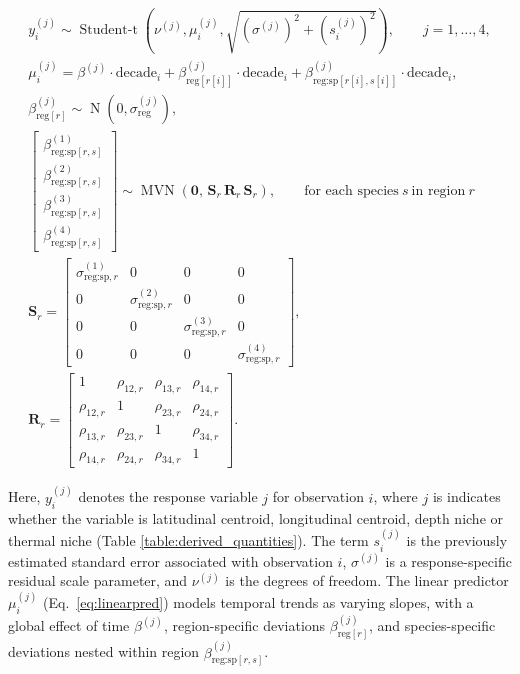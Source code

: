 \documentclass[pdflatex,sn-nature,referee]{sn-jnl}%
\begin{document}
\begin{gather}
y_{i}^{(j)} \sim \operatorname{Student\text{-}t}
\left(\nu^{(j)}, 
\mu_{i}^{(j)}, 
\sqrt{(\sigma^{(j)})^{2} + (s^{(j)}_{i})^{2}}
\right),
\qquad j=1,\dots,4, 
\\
\mu_{i}^{(j)} =
\beta^{(j)} \cdot \text{decade}_{i}
+ \beta_{\text{reg}[r[i]]}^{(j)} \cdot \text{decade}_{i}
+ \beta_{\text{reg:sp}[r[i],s[i]]}^{(j)} \cdot \text{decade}_{i}\label{eq:linearpred},
\\
\beta_{\text{reg}[r]}^{(j)} \sim 
\operatorname{N}\!\left(0,\sigma_{\text{reg}}^{(j)}\right),
\\
\begin{bmatrix}
\beta_{\text{reg:sp}[r,s]}^{(1)} \\
\beta_{\text{reg:sp}[r,s]}^{(2)} \\
\beta_{\text{reg:sp}[r,s]}^{(3)} \\
\beta_{\text{reg:sp}[r,s]}^{(4)}
\end{bmatrix}
\sim 
\operatorname{MVN}\!\left(
\mathbf{0},\,
\mathbf{S}_{r}\,\mathbf{R}_{r}\,\mathbf{S}_{r}
\right),
\qquad \text{for each species}~s~\text{in region}~r
\\
\mathbf{S}_{r} =
\begin{bmatrix}
\sigma^{(1)}_{\text{reg:sp},r} & 0 & 0 & 0 \\
0 & \sigma^{(2)}_{\text{reg:sp},r} & 0 & 0 \\
0 & 0 & \sigma^{(3)}_{\text{reg:sp},r} & 0 \\
0 & 0 & 0 & \sigma^{(4)}_{\text{reg:sp},r}
\end{bmatrix},
\\
\mathbf{R}_{r} =
\begin{bmatrix}
1 & \rho_{12,r} & \rho_{13,r} & \rho_{14,r} \\
\rho_{12,r} & 1 & \rho_{23,r} & \rho_{24,r} \\
\rho_{13,r} & \rho_{23,r} & 1 & \rho_{34,r} \\
\rho_{14,r} & \rho_{24,r} & \rho_{34,r} & 1
\end{bmatrix}.
\end{gather}


\vspace{1em}



\noindent Here, $y^{(j)}_i$ denotes the response variable $j$ for observation $i$, where $j$ is indicates whether the variable is latitudinal centroid,
longitudinal centroid, depth niche or thermal niche (Table \ref{table:derived_quantities}). The term $s^{(j)}_i$ is the previously estimated standard error associated with observation $i$, $\sigma^{(j)}$ is a response-specific residual scale parameter, and $\nu^{(j)}$ is the degrees of freedom. The linear predictor $\mu^{(j)}_i$ (Eq.~\ref{eq:linearpred}) models temporal trends as varying slopes, with a global effect of time $\beta^{(j)}$, region-specific deviations $\beta^{(j)}_{\text{reg}[r]}$, and species-specific deviations nested within region $\beta^{(j)}_{\text{reg:sp}[r,s]}$. 
\end{document}
